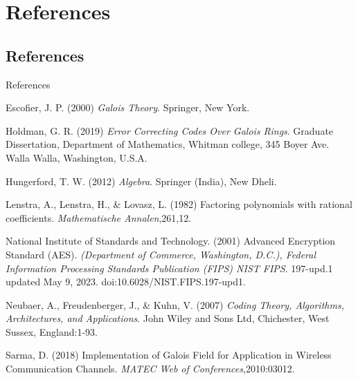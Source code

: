 \documentclass{beamer}
\begin{document}
\section{References}
\subsection{References}
\begin{frame}{References}
  \footnotesize

\begin{thebibliography}{9}

Escofier, J. P. (2000) \emph{Galois Theory}. Springer, New York.

Holdman, G. R. (2019) \emph{Error Correcting Codes  Over Galois Rings}. Graduate Dissertation, Department of Mathematics, Whitman college, 345 Boyer Ave.
Walla Walla, Washington, U.S.A.

Hungerford, T. W. (2012) \emph{Algebra}. Springer (India), New Dheli.

  Lenstra, A., Lenstra, H.,  \& Lovasz, L. (1982)  Factoring polynomials with rational coefficients. \emph{Mathematische Annalen},261,12.

National Institute of Standards and Technology. (2001) Advanced Encryption
Standard (AES). \emph{(Department of Commerce, Washington, D.C.), Federal Information Processing Standards Publication (FIPS) NIST FIPS}. 197-upd.1 updated May 9, 2023. doi:10.6028/NIST.FIPS.197-upd1.

  Neubaer, A.,  Freudenberger, J.,  \& Kuhn, V. (2007) \emph{Coding Theory, Algorithms, Architectures, and Applications}. John Wiley and Sons Ltd, Chichester, West Sussex, England:1-93.


Sarma, D. (2018) Implementation of Galois Field for Application in Wireless Communication Channels. \emph{MATEC Web of Conferences},2010:03012.
  \end{thebibliography}
\end{frame}
\end{document}
